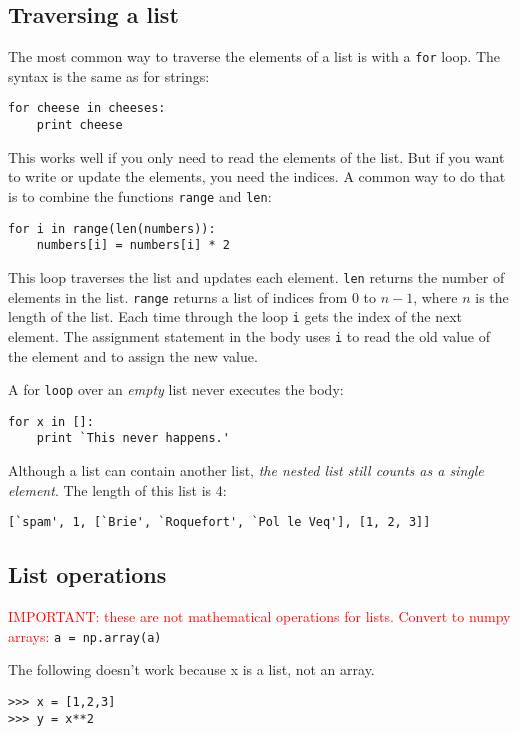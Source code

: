 \documentclass{article}
\begin{document}
\subsection{Traversing a list}
\par The most common way to traverse the elements of a list is with a
\verb|for| loop. The syntax is the same as for strings:
\begin{verbatim}
for cheese in cheeses:
    print cheese
\end{verbatim}
\par This works well if you only need to read the elements of the list. But if
you want to write or update the elements, you need the indices. A common
way to do that is to combine the functions \verb|range| and \verb|len|:
\begin{verbatim}
for i in range(len(numbers)):
    numbers[i] = numbers[i] * 2
\end{verbatim}
\par This loop traverses the list and updates each element.
\verb|len| returns the
number of elements in the list. \verb|range| returns a list of indices from 0
to $n-1$, where $n$ is the length of the list. Each time through the
loop \verb|i| gets the index of the next element. The assignment statement in
the body uses \verb|i| to read the old value of the element and to assign the
new value.
\par A for \verb|loop| over an \emph{empty} list never executes the body:
\begin{verbatim}
for x in []:
    print `This never happens.'
\end{verbatim}
\par Although a list can contain another list, \emph{the nested list still
counts as a single element}. The length of this list is 4:
\begin{verbatim}
[`spam', 1, [`Brie', `Roquefort', `Pol le Veq'], [1, 2, 3]]
\end{verbatim}
\subsection{List operations}
\textcolor{red}{IMPORTANT: these are not mathematical operations
for lists. Convert to numpy arrays:} \verb|a = np.array(a)|

The following doesn't work because x is a list, not an array.
\begin{verbatim}
>>> x = [1,2,3]
>>> y = x**2
\end{verbatim}
\end{document}
